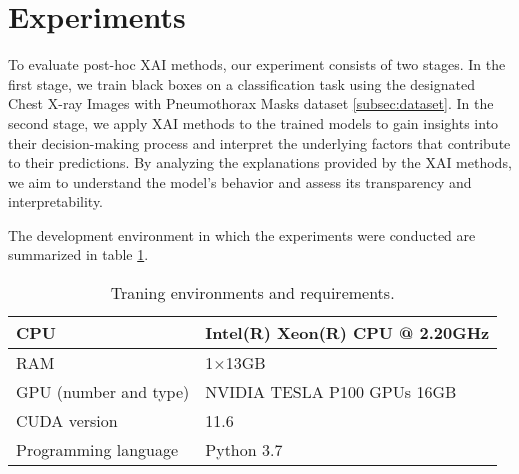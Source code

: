 \section{Experiments}
To evaluate post-hoc XAI methods, our experiment consists of two stages. In the first stage, we train black boxes on a classification task using the designated Chest X-ray Images with Pneumothorax Masks dataset \ref{subsec:dataset}. In the second stage, we apply XAI methods to the trained models to gain insights into their decision-making process and interpret the underlying factors that contribute to their predictions. By analyzing the explanations provided by the XAI methods, we aim to understand the model's behavior and assess its transparency and interpretability.

The development environment in which the experiments were conducted are summarized in table \ref{table:env}.

\begin{table}[t]
\caption{Traning environments and requirements.}\label{table:env}
\centering
\begin{tabular}{ll}
\hline
CPU   & Intel(R) Xeon(R) CPU @ 2.20GHz \\
\hline
RAM                         &1$\times $13GB \\
\hline
GPU (number and type)                         & NVIDIA TESLA P100 GPUs 16GB\\
\hline
CUDA version                  & 11.6\\                          \hline
Programming language                 & Python 3.7\\ 
\hline
\end{tabular}
\end{table}


